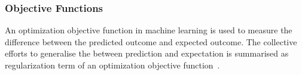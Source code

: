 \subsubsection{Objective Functions}
An optimization objective function in machine learning is used to measure the difference between the predicted outcome and expected outcome. The collective efforts to generalise the  between prediction and expectation is summarised as regularization term of an optimization objective function~\cite{goodfellow_2015}.  